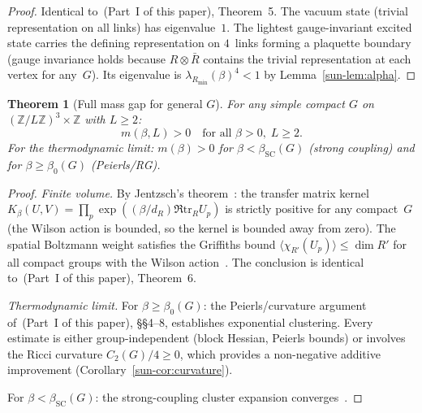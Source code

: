 \documentclass[11pt]{article}
\newtheorem{theorem}{Theorem}[section]
\theoremstyle{definition}
\newcommand{\tr}{\mathrm{tr}}
\newcommand{\Z}{\mathbb{Z}}
\begin{document}
\begin{proof}
Identical to~(Part~I of this paper), Theorem~5.  The vacuum
state (trivial representation on all links) has
eigenvalue~$1$.  The lightest gauge-invariant excited
state carries the defining representation on $4$~links
forming a plaquette boundary (gauge invariance holds
because $R\otimes\bar{R}$ contains the trivial
representation at each vertex for any~$G$).
Its eigenvalue is $\lambda_{R_{\min}}(\beta)^4<1$
by Lemma~\ref{sun-lem:alpha}.
\end{proof}

\begin{theorem}[Full mass gap for general $G$]
\label{sun-thm:full}
For any simple compact $G$ on
$(\Z/L\Z)^3\times\Z$ with $L\ge 2$:
\begin{equation}
m(\beta,L)>0\quad\text{for all }\beta>0,\;L\ge 2.
\end{equation}
For the thermodynamic limit: $m(\beta)>0$ for
$\beta<\beta_{\mathrm{SC}}(G)$ (strong coupling) and
for $\beta\ge\beta_0(G)$ (Peierls/RG).
\end{theorem}

\begin{proof}
\emph{Finite volume.}
By Jentzsch's theorem~\cite{Seiler82}: the transfer
matrix kernel $K_\beta(U,V)
=\prod_p\exp((\beta/d_R)\Re\tr_R U_p)$ is strictly
positive for any compact~$G$ (the Wilson action is
bounded, so the kernel is bounded away from zero).
The spatial Boltzmann weight satisfies the Griffiths
bound $\langle\chi_{R'}(U_p)\rangle\le\dim R'$
for all compact groups with the Wilson
action~\cite{OsterwalderSeiler78,Seiler82}.
The conclusion is identical to~(Part~I of this paper),
Theorem~6.

\emph{Thermodynamic limit.}
For $\beta\ge\beta_0(G)$: the Peierls/curvature
argument of~(Part~I of this paper), \S\S4--8, establishes
exponential clustering.  Every estimate is either
group-independent (block Hessian, Peierls bounds) or
involves the Ricci curvature $C_2(G)/4\ge 0$, which
provides a non-negative additive improvement
(Corollary~\ref{sun-cor:curvature}).

For $\beta<\beta_{\mathrm{SC}}(G)$: the strong-coupling
cluster expansion converges~\cite{Munster81,Seiler82}.
\end{proof}


\label{sun-sec:cluster}
\end{document}
